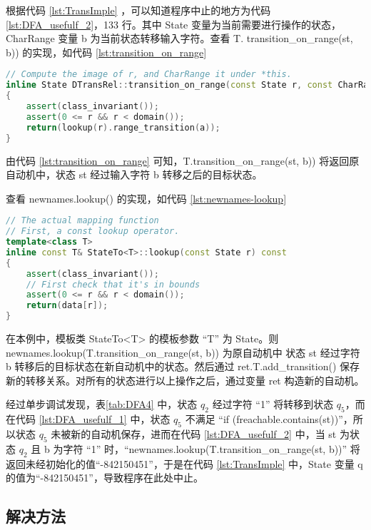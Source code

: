根据代码 \ref{lst:TransImple} ，可以知道程序中止的地方为代码 \ref{lst:DFA_usefulf_2}，133 行。其中 State 变量为当前需要进行操作的状态，CharRange 变量 b 为当前状态转移输入字符。查看 T.
transition\_on\_range(st, b)) 的实现，如代码 \ref{lst:transition_on_range}

\begin{lstlisting}[language=C++,label={lst:transition_on_range},caption={ DTransRel.cpp },firstnumber=108]
// Compute the image of r, and CharRange it under *this.
inline State DTransRel::transition_on_range(const State r, const CharRange a) const
{
    assert(class_invariant());
    assert(0 <= r && r < domain());
    return(lookup(r).range_transition(a));
}
\end{lstlisting}
由代码 \ref{lst:transition_on_range} 可知，T.transition\_on\_range(st, b)) 将返回原自动机中，状态 st 经过输入字符 b 转移之后的目标状态。

查看 newnames.lookup() 的实现，如代码 \ref{lst:newnames-lookup}

\begin{lstlisting}[language=C++,label={lst:newnames-lookup},caption={ StateTo.h },firstnumber=177]
// The actual mapping function
// First, a const lookup operator.
template<class T>
inline const T& StateTo<T>::lookup(const State r) const
{
    assert(class_invariant());
    // First check that it's in bounds
    assert(0 <= r && r < domain());
    return(data[r]);
}
\end{lstlisting}
在本例中，模板类 StateTo<T> 的模板参数 “T” 为 State。则 newnames.lookup(T.transition\_on\_range(st, b)) 为原自动机中 状态 st 经过字符 b 转移后的目标状态在新自动机中的状态。然后通过 ret.T.add\_transition() 保存新的转移关系。对所有的状态进行以上操作之后，通过变量 ret 构造新的自动机。 

经过单步调试发现，表\ref{tab:DFA4} 中，状态 $q_2$ 经过字符 “1” 将转移到状态 $q_5$，而在代码 \ref{lst:DFA_usefulf_1} 中，状态 $q_5$ 不满足 “if (freachable.contains(st))”，所以状态 $q_5$ 未被新的自动机保存，进而在代码 \ref{lst:DFA_usefulf_2} 中，当 st 为状态 $q_2$ 且 b 为字符 “1” 时，“newnames.lookup(T.transition\_on\_range(st, b))” 将返回未经初始化的值“-842150451”，于是在代码 \ref{lst:TransImple} 中，State 变量 q 的值为“-842150451”，导致程序在此处中止。

\subsection{解决方法}

